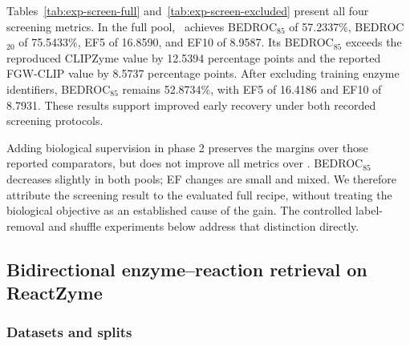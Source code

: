 Tables~\ref{tab:exp-screen-full} and~\ref{tab:exp-screen-excluded} present all
four screening metrics. In the full pool, \methodname\ achieves BEDROC$_{85}$
of 57.2337\%, BEDROC$_{20}$ of 75.5433\%, EF5 of 16.8590, and EF10 of 8.9587.
Its BEDROC$_{85}$ exceeds the reproduced CLIPZyme value by 12.5394 percentage
points and the reported FGW-CLIP value by 8.5737 percentage points. After
excluding training enzyme identifiers, BEDROC$_{85}$ remains 52.8734\%, with
EF5 of 16.4186 and EF10 of 8.7931. These results support improved early
recovery under both recorded screening protocols.

\begin{table}[htbp]
\centering\small
\caption{EnzymeMap screening against the full library: 1,521 queries and
261,907 candidate identifiers. BEDROC is expressed as a percentage. Published
rows come from FGW-CLIP Table 1; locally measured rows use the shared released
CLIPZyme notebook protocol. All \methodname\ rows use the same target-specific
training associations.}
\label{tab:exp-screen-full}
\resizebox{\linewidth}{!}{}
\end{table}

\begin{table}[htbp]
\centering\small
\caption{EnzymeMap screening after excluding training enzyme identifiers:
1,337 eligible queries and 252,113 candidate identifiers. Published values
are from FGW-CLIP Table 2. The strongest published EF10 comparator in this
setting is CLIPZyme (7.81), not FGW-CLIP (7.61).}
\label{tab:exp-screen-excluded}
\resizebox{\linewidth}{!}{}
\end{table}

Adding biological supervision in phase 2 preserves the margins over those
reported comparators, but does not improve all metrics over \methodname.
BEDROC$_{85}$ decreases slightly in both pools; EF changes are small and
mixed. We therefore attribute the screening result to the evaluated full
recipe, without treating the biological objective as an established cause of
the gain. The controlled label-removal and shuffle experiments below address
that distinction directly.
\FloatBarrier

\subsection{Bidirectional enzyme--reaction retrieval on ReactZyme}
\label{sec:exp-reactzyme}
\subsubsection{Datasets and splits}


